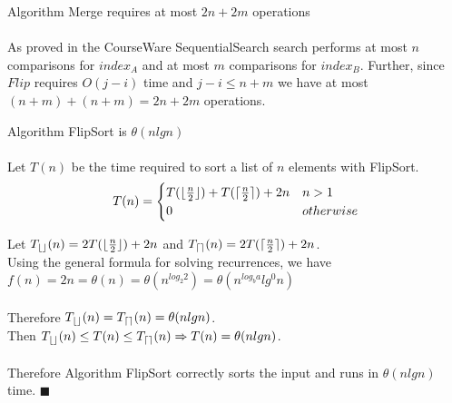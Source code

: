 \documentclass[12pt]{article}
\newenvironment{lemma}[2][Lemma]{\begin{trivlist}
\item[\hskip \labelsep {\bfseries #1}\hskip \labelsep {\bfseries #2.}]}{\end{trivlist}}
\newenvironment{question}[2][Question]{\begin{trivlist}
\item[\hskip \labelsep {\bfseries #1}\hskip \labelsep {\bfseries #2.}]}{\end{trivlist}}
\DeclarePairedDelimiter{\ceil}{\lceil}{\rceil}
\DeclarePairedDelimiter{\floor}{\lfloor}{\rfloor}
\begin{document}
\begin{question}{1 (a)}
  \begin{lemma}{1.3} Algorithm Merge requires at most $2n + 2m$ operations \\ \\
    As proved in the CourseWare SequentialSearch search performs at most $n$
    comparisons for $index_{A}$ and at most $m$ comparisons for $index_{B}$.
    Further, since $Flip$ requires $O(j - i)$ time and $j - i \leq n + m$ we
    have at most $(n + m) + (n + m) = 2n + 2m$ operations.
  \end{lemma}

  \begin{lemma}{1.4} Algorithm FlipSort is $\theta(nlgn)$ \\ \\
    Let $T(n)$ be the time required to sort a list of $n$ elements with FlipSort.\\
    \[
      T(n) = \begin{cases}
                T(\floor{\frac{n}{2}}) + T(\ceil{\frac{n}{2}}) + 2n & n > 1 \\
                0                                    & otherwise \\
             \end{cases}
    \]

    Let $T_{\floor{}}(n) = 2T(\floor{\frac{n}{2}}) + 2n$ and $T_{\ceil{}}(n) = 2T(\ceil{\frac{n}{2}}) + 2n$. \\
    Using the general formula for solving recurrences, we have\\
    $f(n) = 2n = \theta(n) = \theta(n^{log_{2}2}) = \theta(n^{log_{b}a}lg^{0}n)$\\ \\
    Therefore $T_{\floor{}}(n) = T_{\ceil{}}(n) = \theta(nlgn)$.\\
    Then $T_{\floor{}}(n) \leq T(n) \leq T_{\ceil{}}(n) \Rightarrow T(n) = \theta(nlgn)$. \\ \\
    Therefore Algorithm FlipSort correctly sorts the input and runs in $\theta(nlgn)$ time. $\blacksquare$
  \end{lemma}
\end{question}

\pagebreak
\end{document}
